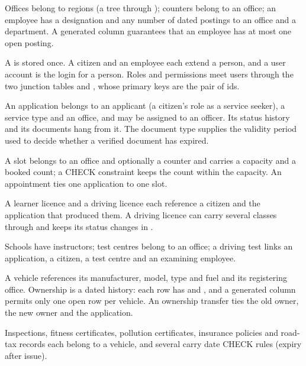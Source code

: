 Offices belong to regions (a tree through ); counters belong to an
office; an employee has a designation and any number of dated postings to an office and a
department. A generated column guarantees that an employee has at most one open posting.

A  is stored once. A citizen and an employee each extend a person, and a user
account is the login for a person. Roles and permissions meet users through the two
junction tables  and , whose primary keys are the pair
of ids.

An application belongs to an applicant (a citizen's role as a service seeker), a service
type and an office, and may be assigned to an officer. Its status history and its documents
hang from it. The document type supplies the validity period used to decide whether a
verified document has expired.

A slot belongs to an office and optionally a counter and carries a capacity and a booked
count; a CHECK constraint keeps the count within the capacity. An appointment ties one
application to one slot.

A learner licence and a driving licence each reference a citizen and the application that
produced them. A driving licence can carry several classes through
 and keeps its status changes in .

Schools have instructors; test centres belong to an office; a driving test links an
application, a citizen, a test centre and an examining employee.

A vehicle references its manufacturer, model, type and fuel and its registering office.
Ownership is a dated history: each row has  and , and a
generated column permits only one open row per vehicle. An ownership transfer ties the
old owner, the new owner and the application.

Inspections, fitness certificates, pollution certificates, insurance policies and
road-tax records each belong to a vehicle, and several carry date CHECK rules
(expiry after issue).

